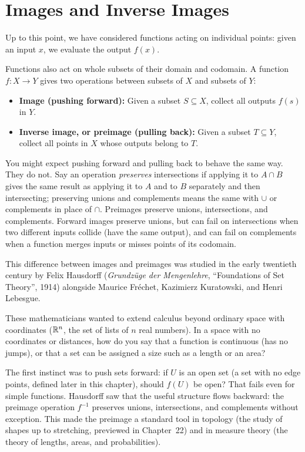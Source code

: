 \section{Images and Inverse Images}
\chapterline

Up to this point, we have considered functions acting on individual points: given an input $x$, we evaluate the output $f(x)$. 

Functions also act on whole subsets of their domain and codomain. A function $f: X \to Y$ gives two operations between subsets of $X$ and subsets of $Y$:
\begin{itemize}
\item \textbf{Image (pushing forward):} Given a subset $S \subseteq X$, collect all outputs $f(s)$ in $Y$.
\item \textbf{Inverse image, or preimage (pulling back):} Given a subset $T \subseteq Y$, collect all points in $X$ whose outputs belong to $T$.
\end{itemize}

You might expect pushing forward and pulling back to behave the same way. They do not. Say an operation \emph{preserves} intersections if applying it to $A \cap B$ gives the same result as applying it to $A$ and to $B$ separately and then intersecting; preserving unions and complements means the same with $\cup$ or complements in place of $\cap$. Preimages preserve unions, intersections, and complements. Forward images preserve unions, but can fail on intersections when two different inputs collide (have the same output), and can fail on complements when a function merges inputs or misses points of its codomain.

\begin{historybox}
This difference between images and preimages was studied in the early twentieth century by Felix Hausdorff (\emph{Grundz\"uge der Mengenlehre}, ``Foundations of Set Theory'', 1914) alongside Maurice Fr\'echet, Kazimierz Kuratowski, and Henri Lebesgue. 

These mathematicians wanted to extend calculus beyond ordinary space with coordinates ($\mathbb{R}^n$, the set of lists of $n$ real numbers). In a space with no coordinates or distances, how do you say that a function is continuous (has no jumps), or that a set can be assigned a size such as a length or an area?

The first instinct was to push sets forward: if $U$ is an open set (a set with no edge points, defined later in this chapter), should $f(U)$ be open? That fails even for simple functions. Hausdorff saw that the useful structure flows backward: the preimage operation $f^{-1}$ preserves unions, intersections, and complements without exception. This made the preimage a standard tool in topology (the study of shapes up to stretching, previewed in Chapter~22) and in measure theory (the theory of lengths, areas, and probabilities).
\end{historybox}

